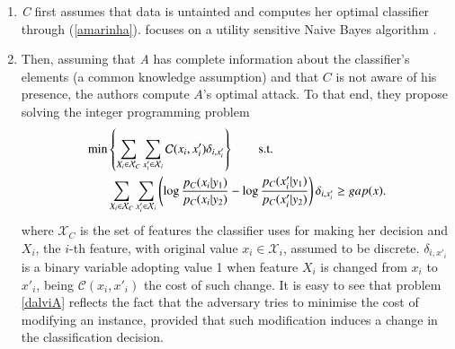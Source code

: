 \begin{enumerate}
\item \textit{C} first assumes that data is untainted and computes her optimal classifier through (\ref{amarinha}).
\textcite{dalvi2004adversarial} focuses on  a utility sensitive Naive Bayes algorithm \parencite{elkan2001foundations}.
\item Then, assuming that \textit{A} has complete information about the classifier's elements (a common knowledge
assumption)
and that $C$ is not aware of his presence, the authors 
compute $A$'s optimal attack. 
To that end, they propose solving the integer programming  problem
\begin{align} \label{dalviA}
    \begin{split}
        \min & \left \lbrace \sum_{X_i \in \mathcal{X}_C} \sum_{x'_i \in \mathcal{X}_i} \mathcal{C}(x_i, x'_i) \delta _{i, x'_i} \right \rbrace\qquad {\rm s.t.} \\
        & \sum_{X_i \in \mathcal{X}_C} \sum_{x'_i \in \mathcal{X}_i} \left ( \log \frac{p_C(x_i|y_1)}{p_C(x_i|y_2)} - \log \frac{p_C(x'_i|y_1)}{p_C(x'_i|y_2)} \right ) \delta _{i, x'_i} \geq gap(x) .
    \end{split}
\end{align}
where $\mathcal{X}_C$ is the set of features the classifier uses for making her decision and $X_i$, the $i$-th feature, with original value $x_i \in \mathcal{X}_i$, assumed to be discrete. %
 $\delta_{i, x'_i}$ is a binary variable adopting value 1 when feature $X_i$ is changed from $x_i$ to $x'_i$, being $\mathcal{C}(x_i, x'_i)$ the cost of such change. 
It is easy to see that problem \eqref{dalviA} reflects the fact that the adversary tries to minimise the cost of modifying an instance, provided that such modification induces a change in the classification decision.

%
%



\end{enumerate}
